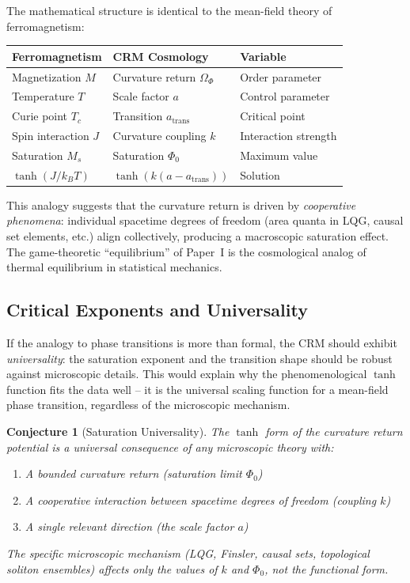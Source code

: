 \documentclass[aps,prd,twocolumn,superscriptaddress,nofootinbib]{revtex4-2}
\newtheorem{conjecture}{Conjecture}
\begin{document}
The mathematical structure is identical to the mean-field theory of ferromagnetism:
\begin{table}[tbp]
\centering
\begin{tabular}{lll}
\toprule
\textbf{Ferromagnetism} & \textbf{CRM Cosmology} & \textbf{Variable} \\
\midrule
Magnetization $M$ & Curvature return $\Omega_\Phi$ & Order parameter \\
Temperature $T$ & Scale factor $a$ & Control parameter \\
Curie point $T_c$ & Transition $a_{\mathrm{trans}}$ & Critical point \\
Spin interaction $J$ & Curvature coupling $k$ & Interaction strength \\
Saturation $M_s$ & Saturation $\Phi_0$ & Maximum value \\
$\tanh(J/k_BT)$ & $\tanh(k(a - a_{\mathrm{trans}}))$ & Solution \\
\bottomrule
\end{tabular}
\end{table}

This analogy suggests that the curvature return is driven by \textit{cooperative phenomena}: individual spacetime degrees of freedom (area quanta in LQG, causal set elements, etc.) align collectively, producing a macroscopic saturation effect. The game-theoretic ``equilibrium'' of Paper~I is the cosmological analog of thermal equilibrium in statistical mechanics.

\subsection{Critical Exponents and Universality}

If the analogy to phase transitions is more than formal, the CRM should exhibit \textit{universality}: the saturation exponent and the transition shape should be robust against microscopic details. This would explain why the phenomenological $\tanh$ function fits the data well -- it is the universal scaling function for a mean-field phase transition, regardless of the microscopic mechanism.

\begin{conjecture}[Saturation Universality]
The $\tanh$ form of the curvature return potential is a \textit{universal} consequence of any microscopic theory with:
\begin{enumerate}
\item A bounded curvature return (saturation limit $\Phi_0$)
\item A cooperative interaction between spacetime degrees of freedom (coupling $k$)
\item A single relevant direction (the scale factor $a$)
\end{enumerate}
The specific microscopic mechanism (LQG, Finsler, causal sets, topological soliton ensembles) affects only the values of $k$ and $\Phi_0$, not the functional form.
\end{conjecture}
\end{document}

